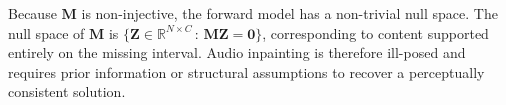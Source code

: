 \documentclass{article}
\begin{document}




Because $\mathbf{M}$ is non-injective, the forward model has a non-trivial null space.
The null space of $\mathbf{M}$ is
$\{ \mathbf{Z} \in \mathbb{R}^{N \times C} \,:\, \mathbf{M}\mathbf{Z} = \mathbf{0} \}$,
corresponding to content supported entirely on the missing interval.
Audio inpainting is therefore ill-posed and requires prior information or structural assumptions to recover a perceptually consistent solution.
\end{document}
